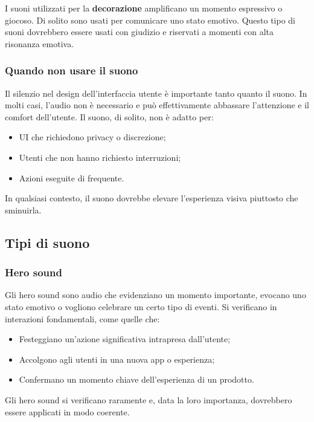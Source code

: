 \documentclass[12pt, a4paper]{report}
\begin{document}
               	I suoni utilizzati per la \textbf{decorazione} amplificano un momento espressivo o giocoso. Di solito sono usati per comunicare
               	uno stato emotivo. Questo tipo di suoni dovrebbero essere usati con giudizio e riservati a momenti con alta risonanza emotiva.


               	\subsubsection{Quando non usare il suono}
                	Il silenzio nel design dell'interfaccia utente è importante tanto quanto il suono. In molti casi, l’audio non è necessario e può
                	effettivamente abbassare l'attenzione e il comfort dell'utente. Il suono, di solito, non è adatto per:
                	\begin{itemize}
                		\item UI che richiedono privacy o discrezione;
                		\item Utenti che non hanno richiesto interruzioni;
                		\item Azioni eseguite di frequente.
                	\end{itemize}
                	In qualsiasi contesto, il suono dovrebbe elevare l'esperienza visiva piuttosto che sminuirla.


              \subsection{Tipi di suono}
              	\subsubsection{Hero sound}
              	Gli hero sound sono audio che evidenziano un momento importante, evocano uno stato emotivo o vogliono celebrare un certo tipo di eventi.
              	Si verificano in interazioni fondamentali, come quelle che:
              	\begin{itemize}
              		\item Festeggiano un'azione significativa intrapresa dall’utente;
              		\item Accolgono agli utenti in una nuova app o esperienza;
              		\item Confermano un momento chiave dell’esperienza di un prodotto.
              	\end{itemize}
              	Gli hero sound si verificano raramente e, data la loro importanza, dovrebbero essere applicati in modo coerente.
\end{document}
